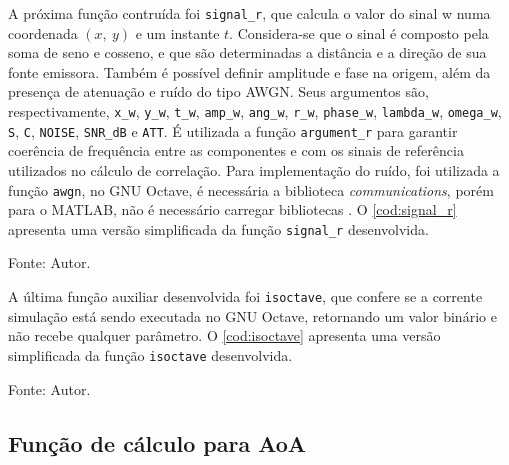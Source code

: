 A próxima função contruída foi \lstinline|signal_r|, que calcula o valor do sinal \ac{w} numa coordenada $(x,~y)$ e um instante $t$.
Considera-se que o sinal é composto pela soma de seno e cosseno, e que são determinadas a distância e a direção de sua fonte emissora.
Também é possível definir amplitude e fase na origem, além da presença de atenuação e ruído do tipo \ac{AWGN}.
Seus argumentos são, respectivamente, \lstinline|x_w|, \lstinline|y_w|, \lstinline|t_w|, \lstinline|amp_w|, \lstinline|ang_w|, \lstinline|r_w|, \lstinline|phase_w|, \lstinline|lambda_w|, \lstinline|omega_w|, \lstinline|S|, \lstinline|C|, \lstinline|NOISE|, \lstinline|SNR_dB| e \lstinline|ATT|.
É utilizada a função \lstinline|argument_r| para garantir coerência de frequência entre as componentes e com os sinais de referência utilizados no cálculo de correlação.
Para implementação do ruído, foi utilizada a função \lstinline|awgn|, no GNU Octave, é necessária a biblioteca \textit{communications}, porém para o MATLAB, não é necessário carregar bibliotecas \cite{awgnOctave, awgnMATLAB}.
O \autoref{cod:signal_r} apresenta uma versão simplificada da função \lstinline|signal_r| desenvolvida.

\begin{lstfloat}[htbp]
	\centering
	
	\caption*{Fonte: Autor.}
\end{lstfloat}


A última função auxiliar desenvolvida foi \lstinline|isoctave|, que confere se a corrente simulação está sendo executada no GNU Octave, retornando um valor binário e não recebe qualquer parâmetro.
O \autoref{cod:isoctave} apresenta uma versão simplificada da função \lstinline|isoctave| desenvolvida.

\begin{lstfloat}[htbp]
	\centering
	
	\caption*{Fonte: Autor.}
\end{lstfloat}

\subsection{Função de cálculo para \acs{AoA}}

